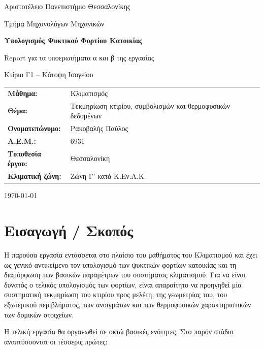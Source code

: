 \documentclass[12pt,a4paper]{article}
\begin{document}
\begin{titlepage}
\centering

{\Large Αριστοτέλειο Πανεπιστήμιο Θεσσαλονίκης\par}
{\large Τμήμα Μηχανολόγων Μηχανικών\par}
\vspace{1.8cm}

{\LARGE\bfseries Υπολογισμός Ψυκτικού Φορτίου Κατοικίας\par}
\vspace{0.5cm}
{\Large Report για τα υποερωτήματα α και β της εργασίας\par}
\vspace{0.8cm}
{\large Κτίριο Γ1 -- Κάτοψη Ισογείου\par}
\vspace{1.6cm}

\begin{tabular}{>{\bfseries}p{4.2cm}p{9.2cm}}
Μάθημα: & Κλιματισμός \\
Θέμα: & Τεκμηρίωση κτιρίου, συμβολισμών και θερμοφυσικών δεδομένων \\
Ονοματεπώνυμο: & Ρακοβαλής Παύλος \\
Α.Ε.Μ.: & 6931 \\
Τοποθεσία έργου: & Θεσσαλονίκη \\
Κλιματική ζώνη: & Ζώνη Γ' κατά Κ.Εν.Α.Κ. \\
\end{tabular}

\vfill
{\large \today\par}
\thispagestyle{fancy}
\end{titlepage}

\tableofcontents
\newpage

\section{Εισαγωγή / Σκοπός}

Η παρούσα εργασία εντάσσεται στο πλαίσιο του μαθήματος του Κλιματισμού και έχει ως
γενικό αντικείμενο τον υπολογισμό των ψυκτικών φορτίων κατοικίας και τη διαμόρφωση
των βασικών παραμέτρων του συστήματος κλιματισμού. Για να είναι δυνατός ο τελικός
υπολογισμός των φορτίων, είναι απαραίτητο να προηγηθεί μία συστηματική τεκμηρίωση
του κτιρίου προς μελέτη, της γεωμετρίας του, του εξωτερικού περιβλήματος, των
ανοιγμάτων και των θερμοφυσικών χαρακτηριστικών των δομικών στοιχείων.

Η τελική εργασία θα οργανωθεί σε οκτώ βασικές ενότητες. Στο παρόν
στάδιο αναπτύσσονται οι τέσσερις πρώτες:
\end{document}
